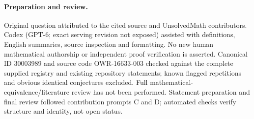 \documentclass[11pt]{article}
\begin{document}
\paragraph{Preparation and review.}
Original question attributed to the cited source and UnsolvedMath contributors. Codex (GPT-6; exact serving revision not exposed) assisted with definitions, English summaries, source inspection and formatting. No new human mathematical authorship or independent proof verification is asserted. Canonical ID 30003989 and source code OWR-16633-003 checked against the complete supplied registry and existing repository statements; known flagged repetitions and obvious identical conjectures excluded. Full mathematical-equivalence/literature review has not been performed. Statement preparation and final review followed contribution prompts C and D; automated checks verify structure and identity, not open status.
\label{end:30003989}
\end{document}

